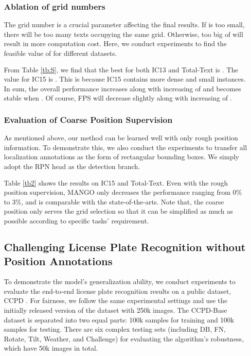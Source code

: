 \documentclass[letterpaper]{article} \usepackage{aaai21}  \usepackage{times}  \usepackage{helvet} \usepackage{courier}  \usepackage[hyphens]{url}  \usepackage{graphicx} \urlstyle{rm} \def\UrlFont{\rm}  \usepackage{natbib}  \usepackage{caption} \frenchspacing  \setlength{\pdfpagewidth}{8.5in}  \setlength{\pdfpageheight}{11in}  \usepackage{multirow}
\begin{document}
\subsubsection{Ablation of grid numbers}
The grid number  is a crucial parameter affecting the final results.
If  is too small, there will be too many texts occupying the same grid. Otherwise, too big of  will result in more computation cost.
Here, we conduct experiments to find the feasible value of  for different datasets.


From Table \ref{tb:S}, we find that the best  for both IC13 and Total-Text is .
The value for IC15 is . This is because IC15 contains more dense and small instances.
In sum, the overall performance increases along with increasing of  and becomes stable when .
Of course, FPS will decrease slightly along with increasing of .


\subsubsection{Evaluation of Coarse Position Supervision}
As mentioned above, our method can be learned well with only rough position information.
To demonstrate this, we also conduct the experiments to transfer all localization annotations as the form of rectangular bounding boxes.  We simply adopt the RPN head as the detection branch.


Table \ref{tb2} shows the results on IC15 and Total-Text.
Even with the rough position supervision, MANGO only decreases the performance ranging from 0\% to 3\%, and is comparable with the state-of-the-arts.
Note that, the coarse position only serves the grid selection so that it can be simplified as much as possible according to specific tasks' requirement.

\subsection{Challenging License Plate Recognition without Position Annotations}
To demonstrate the model's generalization ability, we conduct experiments to evaluate the end-to-end license plate recognition results on a public dataset, CCPD \cite{xu2018towards}.
For fairness, we follow the same experimental settings and use the initially released version of the dataset with 250k images.
The CCPD-Base dataset is separated into two equal parts: 100k samples for training and 100k samples for testing.
There are six complex testing sets (including DB, FN, Rotate, Tilt, Weather, and Challenge) for evaluating the algorithm's robustness, which have 50k images in total.
\end{document}
